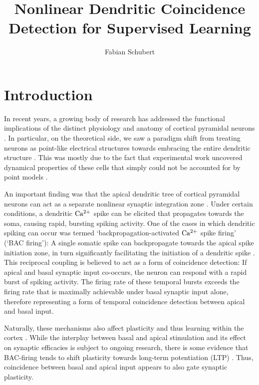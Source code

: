 \documentclass[10pt,a4paper,twocolumn]{article}
\author{Fabian Schubert}
\title{Nonlinear Dendritic Coincidence Detection for Supervised Learning}
\begin{document}
	\maketitle

		\section{Introduction}
		
		In recent years, a growing body of research has addressed the 
		functional implications of the distinct physiology and anatomy of 
		cortical pyramidal neurons \cite{Spruston2008,Hay2011,Ramaswamy2015}. 
		In particular, on the theoretical side,
		we saw a paradigm shift from treating neurons as point-like electrical
		structures towards embracing the entire dendritic structure 
		\cite{Larkum2009,Poirazi2009,Shai2015}. This was 
		mostly due to the fact that experimental work uncovered dynamical properties
		of these cells that simply could not be accounted for by point models
		\cite{Spruston1995,Hausser2000}.
		
		An important finding was that the apical dendritic tree of
		cortical pyramidal neurons can act as a separate nonlinear synaptic 
		integration zone \cite{Spruston2008,Branco2011}. 
		Under certain conditions, a dendritic $\rm Ca^{2+}$ spike
		can be elicited that propagates towards the soma, causing rapid, bursting
		spiking activity. One of the cases in which dendritic spiking can occur
		was termed `backpropagation-activated $\rm Ca^{2+}$ spike firing' 
		(`BAC firing'): A single somatic spike can backpropagate towards the apical
		spike initiation zone, in turn significantly facilitating the initiation of 
		a dendritic spike \cite{Stuart2001,Spruston2008,Larkum2013}. 
		This reciprocal coupling is believed to act as a form of
		coincidence detection: If apical and basal synaptic input co-occurs, the 
		neuron can respond with a rapid burst of spiking activity. The firing rate
		of these temporal bursts exceeds the firing rate that is maximally achievable 
		under basal synaptic input alone, therefore representing a form of temporal coincidence
		detection between apical and basal input.
		
		Naturally, these mechanisms also affect plasticity and thus learning
		within the cortex \cite{Sjoestroem2006,Ebner2019}. 
		While the interplay between basal and apical stimulation and
		its effect on synaptic efficacies is subject to ongoing research, there is
		some evidence that BAC-firing tends to shift plasticity towards long-term potentiation
		(LTP) \cite{Letzkus2006}. 
		Thus, coincidence between basal and apical input appears to also gate synaptic
		plasticity.
		
\end{document}
